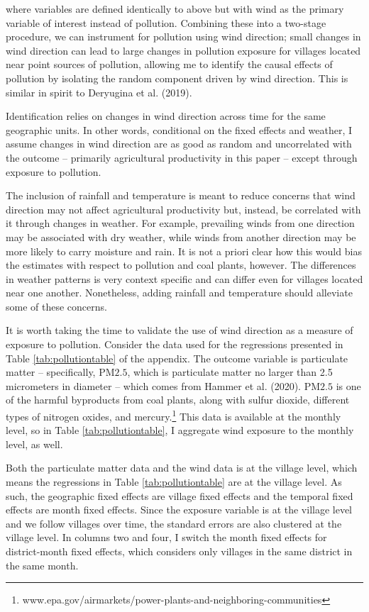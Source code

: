 \documentclass[
]{article}
\begin{document}
where variables are defined identically to above but with wind as the primary variable of interest instead of pollution. Combining these into a two-stage procedure, we can instrument for pollution using wind direction; small changes in wind direction can lead to large changes in pollution exposure for villages located near point sources of pollution, allowing me to identify the causal effects of pollution by isolating the random component driven by wind direction. This is similar in spirit to Deryugina et al. (2019).

Identification relies on changes in wind direction across time for the same geographic units. In other words, conditional on the fixed effects and weather, I assume changes in wind direction are as good as random and uncorrelated with the outcome -- primarily agricultural productivity in this paper -- except through exposure to pollution.

The inclusion of rainfall and temperature is meant to reduce concerns that wind direction may not affect agricultural productivity but, instead, be correlated with it through changes in weather. For example, prevailing winds from one direction may be associated with dry weather, while winds from another direction may be more likely to carry moisture and rain. It is not a priori clear how this would bias the estimates with respect to pollution and coal plants, however. The differences in weather patterns is very context specific and can differ even for villages located near one another. Nonetheless, adding rainfall and temperature should alleviate some of these concerns.

It is worth taking the time to validate the use of wind direction as a measure of exposure to pollution. Consider the data used for the regressions presented in Table \ref{tab:pollutiontable} of the appendix. The outcome variable is particulate matter -- specifically, \(\mathrm{PM 2.5}\), which is particulate matter no larger than 2.5 micrometers in diameter -- which comes from Hammer et al. (2020). \(\mathrm{PM 2.5}\) is one of the harmful byproducts from coal plants, along with sulfur dioxide, different types of nitrogen oxides, and mercury.\footnote{www.epa.gov/airmarkets/power-plants-and-neighboring-communities} This data is available at the monthly level, so in Table \ref{tab:pollutiontable}, I aggregate wind exposure to the monthly level, as well.

Both the particulate matter data and the wind data is at the village level, which means the regressions in Table \ref{tab:pollutiontable} are at the village level. As such, the geographic fixed effects are village fixed effects and the temporal fixed effects are month fixed effects. Since the exposure variable is at the village level and we follow villages over time, the standard errors are also clustered at the village level. In columns two and four, I switch the month fixed effects for district-month fixed effects, which considers only villages in the same district in the same month.
\end{document}
